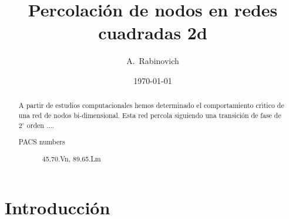 \documentclass[%
 reprint,
 amsmath,amssymb,
 aps,
spanish]{revtex4-1}
\begin{document}

\title{Percolaci\'on de nodos en redes cuadradas 2d}%

\author{A.~Rabinovich}
%


\date{\today}%

\begin{abstract}
A partir de estudios computacionales hemos determinado el comportamiento cr\'\i tico de una red de nodos bi-dimensional. Esta red percola siguiendo una transici\'on de fase de $2^\circ$ orden .... 


\begin{description}
\item[PACS numbers]
45.70.Vn, 89.65.Lm
\end{description}
\end{abstract}

\maketitle


\section{\label{intro}Introducci\'on}
\end{document}
